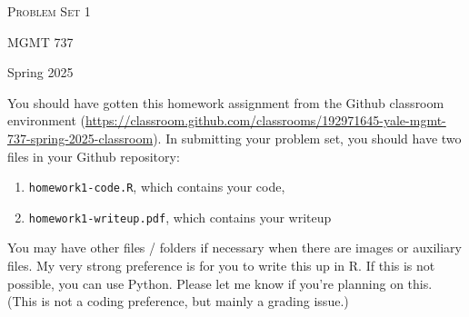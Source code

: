 \documentclass[11pt, a4paper]{article}
\begin{document}
\begin{center}
  {\Large \textsc{Problem Set 1}}

  MGMT 737
\end{center}
\begin{center}
  Spring 2025
\end{center}

You should have gotten this homework assignment from the Github classroom environment (\url{https://classroom.github.com/classrooms/192971645-yale-mgmt-737-spring-2025-classroom}). In submitting your problem set, you should have two files in your Github repository:

\begin{enumerate}
  \item \texttt{homework1-code.R}, which contains your code,
  \item \texttt{homework1-writeup.pdf}, which contains your writeup 
\end{enumerate} 

You may have other files / folders if necessary when there are images or auxiliary files. My very strong preference is for you to write this up in R. If this is not possible, you can use Python. Please let me know if you're planning on this. (This is not a coding preference, but mainly a grading issue.)
\end{document}
